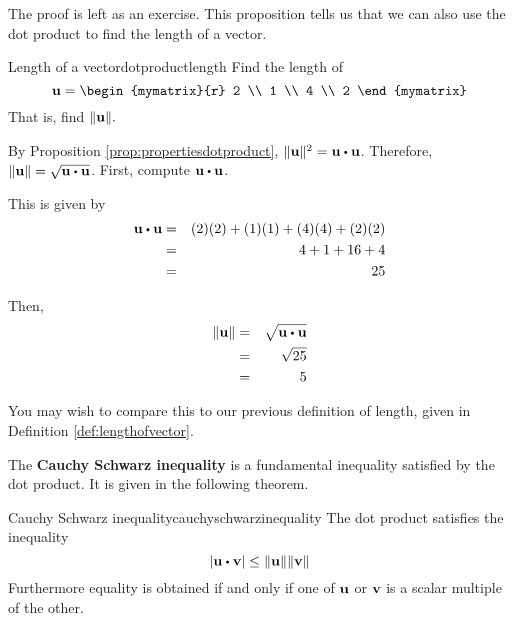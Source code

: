 The proof is left as an exercise. This proposition tells us that we can also use the dot product to find the length of a vector.

\begin{example}{Length of a vector}{dotproductlength}
Find the length of
\begin{equation*}
\vect{u}
=
\begin{mymatrix}{r}
2 \\
1 \\
4 \\
2
\end{mymatrix} 
\end{equation*}
 That is, find $\| {\bf u} \| .$
\end{example}

\begin{solution}
By Proposition \ref{prop:propertiesdotproduct},  $\vectlength \vect{u} \vectlength ^{2} = \vect{u} \dotprod \vect{u}$. 
Therefore, $\vectlength \vect{u} \vectlength = \sqrt {\vect{u} \dotprod \vect{u}}$.
First, compute $\vect{u} \dotprod \vect{u}$. 

This is given by 
\begin{eqnarray*}
\vect{u} \dotprod \vect{u}
&=&
(2)(2) + (1)(1) + (4)(4) + (2)(2) \\
&=&
4 + 1 + 16 + 4 \\
&=&
25
\end{eqnarray*}

Then, 
\begin{eqnarray*}
\vectlength \vect{u} \vectlength 
&=& \sqrt {\vect{u} \dotprod \vect{u}} \\
&=& \sqrt{25} \\
&=& 5
\end{eqnarray*}
\end{solution}

You may wish to compare this to our previous definition of length, 
given in Definition \ref{def:lengthofvector}. 

The \textbf{Cauchy Schwarz inequality} is a fundamental inequality satisfied by the dot product. 
 It is given in the following theorem.

\begin{theorem}{Cauchy Schwarz inequality}{cauchyschwarzinequality}
The dot product satisfies the inequality
\begin{equation}
\left\vert \vect{u}\dotprod \vect{v}\right\vert \leq \vectlength \vect{u}\vectlength \vectlength \vect{v}\vectlength   \label{cauchy}
\end{equation}
Furthermore equality is obtained if and only if one of ${\bf u}$ or ${\bf v}$ is a scalar multiple of the other.
\end{theorem}

